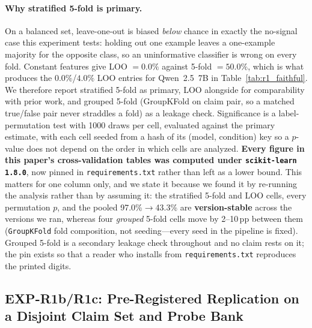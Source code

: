\paragraph{Why stratified 5-fold is primary.} On a balanced set, leave-one-out is biased \emph{below} chance in exactly the no-signal case this experiment tests: holding out one example leaves a one-example majority for the opposite class, so an uninformative classifier is wrong on every fold. Constant features give LOO $=0.0\%$ against 5-fold $=50.0\%$, which is what produces the $0.0\%$/$4.0\%$ LOO entries for Qwen~2.5~7B in Table~\ref{tab:r1_faithful}. We therefore report stratified 5-fold as primary, LOO alongside for comparability with prior work, and grouped 5-fold (GroupKFold on claim pair, so a matched true/false pair never straddles a fold) as a leakage check. Significance is a label-permutation test with 1000 draws per cell, evaluated against the primary estimate, with each cell seeded from a hash of its (model, condition) key so a $p$-value does not depend on the order in which cells are analyzed. \textbf{Every figure in this paper's cross-validation tables was computed under \texttt{scikit-learn 1.8.0}}, now pinned in \texttt{requirements.txt} rather than left as a lower bound. This matters for one column only, and we state it because we found it by re-running the analysis rather than by assuming it: the stratified 5-fold and LOO cells, every permutation $p$, and the pooled 97.0\%$\to$43.3\% are \textbf{version-stable} across the versions we ran, whereas four \emph{grouped} 5-fold cells move by 2--10\,pp between them (\texttt{GroupKFold} fold composition, not seeding---every seed in the pipeline is fixed). Grouped 5-fold is a secondary leakage check throughout and no claim rests on it; the pin exists so that a reader who installs from \texttt{requirements.txt} reproduces the printed digits.

\subsection{EXP-R1b/R1c: Pre-Registered Replication on a Disjoint Claim Set and Probe Bank}
\label{app:r1b}

